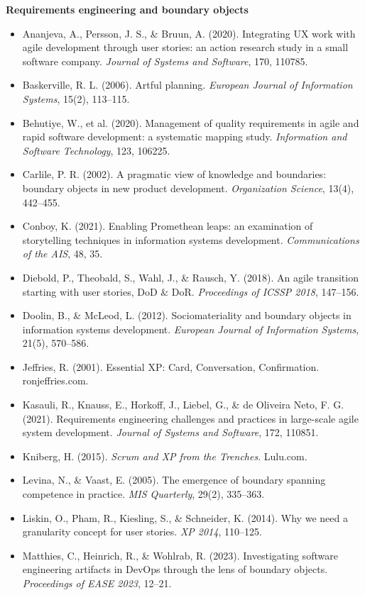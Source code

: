 \documentclass[11pt]{article}
\begin{document}
\textbf{Requirements engineering and boundary objects}
\begin{itemize}[leftmargin=*]
  \item Ananjeva, A., Persson, J. S., \& Bruun, A. (2020). Integrating UX work with agile development through user stories: an action research study in a small software company. \emph{Journal of Systems and Software}, 170, 110785.
  \item Baskerville, R. L. (2006). Artful planning. \emph{European Journal of Information Systems}, 15(2), 113--115.
  \item Behutiye, W., et al. (2020). Management of quality requirements in agile and rapid software development: a systematic mapping study. \emph{Information and Software Technology}, 123, 106225.
  \item Carlile, P. R. (2002). A pragmatic view of knowledge and boundaries: boundary objects in new product development. \emph{Organization Science}, 13(4), 442--455.
  \item Conboy, K. (2021). Enabling Promethean leaps: an examination of storytelling techniques in information systems development. \emph{Communications of the AIS}, 48, 35.
  \item Diebold, P., Theobald, S., Wahl, J., \& Rausch, Y. (2018). An agile transition starting with user stories, DoD \& DoR. \emph{Proceedings of ICSSP 2018}, 147--156.
  \item Doolin, B., \& McLeod, L. (2012). Sociomateriality and boundary objects in information systems development. \emph{European Journal of Information Systems}, 21(5), 570--586.
  \item Jeffries, R. (2001). Essential XP: Card, Conversation, Confirmation. ronjeffries.com.
  \item Kasauli, R., Knauss, E., Horkoff, J., Liebel, G., \& de Oliveira Neto, F. G. (2021). Requirements engineering challenges and practices in large-scale agile system development. \emph{Journal of Systems and Software}, 172, 110851.
  \item Kniberg, H. (2015). \emph{Scrum and XP from the Trenches}. Lulu.com.
  \item Levina, N., \& Vaast, E. (2005). The emergence of boundary spanning competence in practice. \emph{MIS Quarterly}, 29(2), 335--363.
  \item Liskin, O., Pham, R., Kiesling, S., \& Schneider, K. (2014). Why we need a granularity concept for user stories. \emph{XP 2014}, 110--125.
  \item Matthies, C., Heinrich, R., \& Wohlrab, R. (2023). Investigating software engineering artifacts in DevOps through the lens of boundary objects. \emph{Proceedings of EASE 2023}, 12--21.

\end{itemize}
\end{document}
